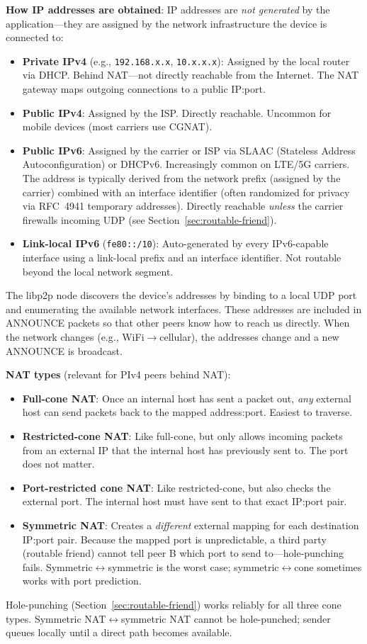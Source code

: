\documentclass[11pt,a4paper]{article}
\begin{document}
\textbf{How IP addresses are obtained}: IP addresses are \emph{not generated} by the application---they are assigned by the network infrastructure the device is connected to:
\begin{itemize}[nosep]
  \item \textbf{Private IPv4} (e.g., \texttt{192.168.x.x}, \texttt{10.x.x.x}): Assigned by the local router via DHCP. Behind NAT---not directly reachable from the Internet. The NAT gateway maps outgoing connections to a public IP:port.
  \item \textbf{Public IPv4}: Assigned by the ISP. Directly reachable. Uncommon for mobile devices (most carriers use CGNAT).
  \item \textbf{Public IPv6}: Assigned by the carrier or ISP via SLAAC (Stateless Address Autoconfiguration) or DHCPv6. Increasingly common on LTE/5G carriers. The address is typically derived from the network prefix (assigned by the carrier) combined with an interface identifier (often randomized for privacy via RFC~4941 temporary addresses). Directly reachable \emph{unless} the carrier firewalls incoming UDP (see Section~\ref{sec:routable-friend}).
  \item \textbf{Link-local IPv6} (\texttt{fe80::/10}): Auto-generated by every IPv6-capable interface using a link-local prefix and an interface identifier. Not routable beyond the local network segment.
\end{itemize}
The libp2p node discovers the device's addresses by binding to a local UDP port and enumerating the available network interfaces. These addresses are included in ANNOUNCE packets so that other peers know how to reach us directly. When the network changes (e.g., WiFi$\to$cellular), the addresses change and a new ANNOUNCE is broadcast.

\textbf{NAT types} (relevant for PIv4 peers behind NAT):
\begin{itemize}[nosep]
  \item \textbf{Full-cone NAT}: Once an internal host has sent a packet out, \emph{any} external host can send packets back to the mapped address:port. Easiest to traverse.
  \item \textbf{Restricted-cone NAT}: Like full-cone, but only allows incoming packets from an external IP that the internal host has previously sent to. The port does not matter.
  \item \textbf{Port-restricted cone NAT}: Like restricted-cone, but also checks the external port. The internal host must have sent to that exact IP:port pair.
  \item \textbf{Symmetric NAT}: Creates a \emph{different} external mapping for each destination IP:port pair. Because the mapped port is unpredictable, a third party (routable friend) cannot tell peer B which port to send to---hole-punching fails. Symmetric$\leftrightarrow$symmetric is the worst case; symmetric$\leftrightarrow$cone sometimes works with port prediction.
\end{itemize}
Hole-punching (Section~\ref{sec:routable-friend}) works reliably for all three cone types. Symmetric NAT$\leftrightarrow$symmetric NAT cannot be hole-punched; sender queues locally until a direct path becomes available.
\end{document}
